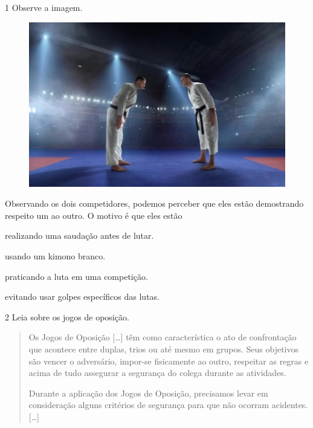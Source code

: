 \num{1} Observe a imagem.
  \begin{figure}[htpb!]
\includegraphics[width=\textwidth]{./imgs/img14.jpg}
\end{figure}

\noindent{}Observando os dois competidores, podemos perceber que eles estão
demostrando respeito um ao outro. O motivo é que eles estão

\begin{escolha}
\item realizando uma saudação antes de lutar.

\item usando um kimono branco.

\item praticando a luta em uma competição.

\item evitando usar golpes específicos das lutas.
\end{escolha}


\num{2} Leia sobre os jogos de oposição.
\begin{quote}
  Os Jogos de Oposição {[}\ldots{}{]} têm como característica o ato de
  confrontação que acontece entre duplas, trios ou até mesmo em grupos.
  Seus objetivos são vencer o adversário, impor-se fisicamente ao outro,
  respeitar as regras e acima de tudo assegurar a segurança do colega
  durante as atividades.

Durante a aplicação dos Jogos de Oposição, precisamos levar em
consideração alguns critérios de segurança para que não ocorram
acidentes. {[}\ldots{}{]}

\end{quote}


